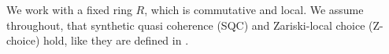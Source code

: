 
We work with a fixed ring $R$, which is commutative and local.
We assume throughout, that synthetic quasi coherence (SQC) and Zariski-local choice (Z-choice) hold,
like they are defined in \cite{draft}.